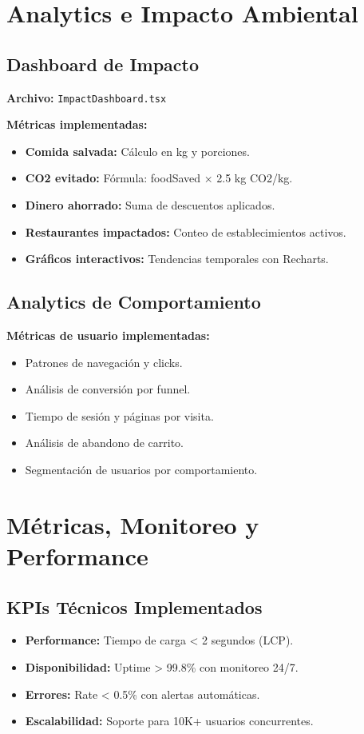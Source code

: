 \documentclass[a4paper,12pt]{article}
\begin{document}
\section{Analytics e Impacto Ambiental}

\subsection{Dashboard de Impacto}
\textbf{Archivo:} \texttt{ImpactDashboard.tsx}

\textbf{Métricas implementadas:}
\begin{itemize}
  \item \textbf{Comida salvada:} Cálculo en kg y porciones.
  \item \textbf{CO2 evitado:} Fórmula: foodSaved × 2.5 kg CO2/kg.
  \item \textbf{Dinero ahorrado:} Suma de descuentos aplicados.
  \item \textbf{Restaurantes impactados:} Conteo de establecimientos activos.
  \item \textbf{Gráficos interactivos:} Tendencias temporales con Recharts.
\end{itemize}

\subsection{Analytics de Comportamiento}
\textbf{Métricas de usuario implementadas:}
\begin{itemize}
  \item Patrones de navegación y clicks.
  \item Análisis de conversión por funnel.
  \item Tiempo de sesión y páginas por visita.
  \item Análisis de abandono de carrito.
  \item Segmentación de usuarios por comportamiento.
\end{itemize}

\section{Métricas, Monitoreo y Performance}

\subsection{KPIs Técnicos Implementados}
\begin{itemize}
  \item \textbf{Performance:} Tiempo de carga < 2 segundos (LCP).
  \item \textbf{Disponibilidad:} Uptime > 99.8\% con monitoreo 24/7.
  \item \textbf{Errores:} Rate < 0.5\% con alertas automáticas.
  \item \textbf{Escalabilidad:} Soporte para 10K+ usuarios concurrentes.
\end{itemize}
\end{document}
